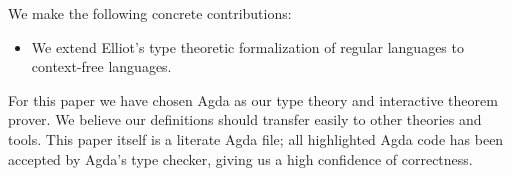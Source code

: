 
We make the following concrete contributions:
\begin{itemize}
\item We extend Elliot's type theoretic formalization of regular languages to context-free languages.
\end{itemize}

For this paper we have chosen Agda as our type theory and interactive theorem prover. We believe our definitions should transfer easily to other theories and tools. This paper itself is a literate Agda file; all highlighted Agda code has been accepted by Agda's type checker, giving us a high confidence of correctness.





